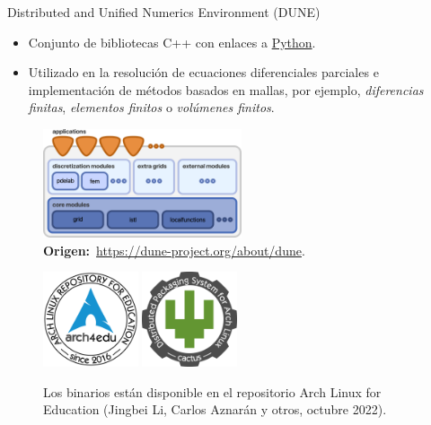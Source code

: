 \begin{frame}
\begin{alertblock}{Distributed and Unified Numerics Environment (DUNE)}
\begin{itemize}
			\item

			      Conjunto de bibliotecas \alert{C++} con enlaces a
			      \href{https://pypi.org/search/?q=dune-}{\alert{Python}}.


			\item

			      Utilizado en la resolución de
			      \alert{ecuaciones diferenciales parciales} e
			      implementación de métodos basados en mallas, por ejemplo,
			      \emph{diferencias finitas}, \emph{elementos finitos} o
			      \emph{volúmenes finitos}.
		\end{itemize}
	\end{alertblock}


	\begin{minipage}{0.45\textwidth}
		\begin{figure}[ht!]
			\centering
			\includegraphics[height=3.2cm]{dunedesign}
			\caption*{
				\textbf{Origen:}~\url{https://dune-project.org/about/dune}.
			}
		\end{figure}
	\end{minipage}\qquad\qquad
	\begin{minipage}{0.45\textwidth}
		\begin{figure}[ht!]
			\centering
			\href{https://github.com/arch4edu/arch4edu}{\includegraphics[height=2.8cm]{arch4edu}}\quad\quad
			\href{https://github.com/arch4edu/cactus}{\includegraphics[height=2.8cm]{cactus}}
			\caption{Los binarios están disponible en el repositorio
				\alert{Arch Linux for Education}
				(Jingbei Li, Carlos Aznarán y otros, octubre 2022).
			}
		\end{figure}
	\end{minipage}
\end{frame}


